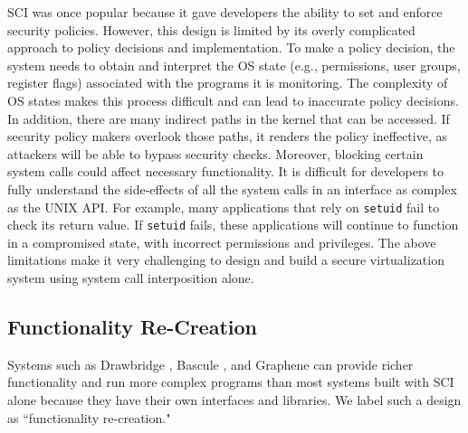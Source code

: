 SCI was once popular
because it gave developers the ability to set and enforce security policies.
However, this design is limited by its overly complicated approach to policy
decisions and implementation.
To make a policy decision, the system needs to
obtain and interpret the OS state (e.g., permissions, user groups, register flags)
associated with the programs it is monitoring.
The complexity of OS states makes this process difficult and can lead to
inaccurate policy decisions.
In addition, there are many indirect paths in the kernel that can be accessed.
If security policy makers overlook those paths, it renders the
policy ineffective, as attackers will be able to
bypass security checks.
Moreover, blocking
certain system calls could affect necessary functionality.
It is difficult for developers to fully understand the side-effects of all the
system calls in an interface as complex as the UNIX API.
For example, many applications that rely on \texttt{setuid} fail to check its return value.
If \texttt{setuid} fails, these applications will continue to function in a compromised state,
with incorrect permissions and privileges.
The above limitations make it very challenging to design and build a secure virtualization system using
system call interposition alone.

\subsection{Functionality Re-Creation}
Systems such as Drawbridge \cite{Drawbridge-11},
Bascule \cite{Bascule}, and Graphene \cite{Graphene-14} can
provide richer functionality and run more complex programs than most systems built
with SCI alone because they have their own
interfaces and libraries. We label such a design
as ``functionality re-creation."

